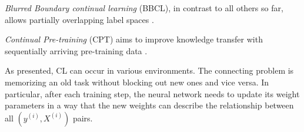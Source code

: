 \textit{Blurred Boundary continual learning} (BBCL), in contrast to all others so far, allows partially overlapping label spaces \cite{bidaki2025,LW}.

\textit{Continual Pre-training} (CPT) aims to improve knowledge transfer with sequentially arriving pre-training data \cite{bidaki2025, LW}.

As presented, CL can occur in various environments. The connecting problem is memorizing an old task without blocking out new ones and vice versa. In particular, after each training step, the neural network needs to update its weight parameters in a way that the new weights can describe the relationship between all $(y^{(i)}, X^{(i)})$ pairs.
